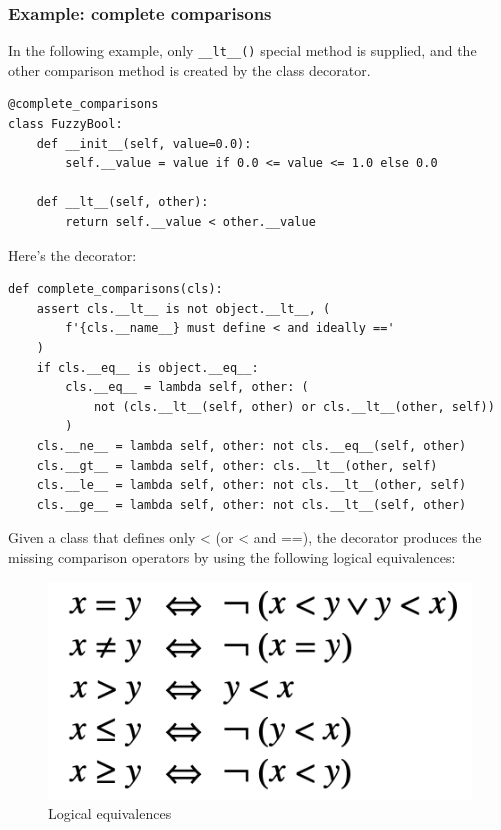 \subsubsection{Example: complete comparisons}


In the following example, only \verb|__lt__()| special method is supplied, and the other comparison method is created by the class decorator.
\begin{lstlisting}
@complete_comparisons
class FuzzyBool:
    def __init__(self, value=0.0):
        self.__value = value if 0.0 <= value <= 1.0 else 0.0

    def __lt__(self, other):
        return self.__value < other.__value
\end{lstlisting}


Here's the decorator:
\begin{lstlisting}
def complete_comparisons(cls):
    assert cls.__lt__ is not object.__lt__, (
        f'{cls.__name__} must define < and ideally =='
    )
    if cls.__eq__ is object.__eq__:
        cls.__eq__ = lambda self, other: (
            not (cls.__lt__(self, other) or cls.__lt__(other, self))
        )
    cls.__ne__ = lambda self, other: not cls.__eq__(self, other)
    cls.__gt__ = lambda self, other: cls.__lt__(other, self)
    cls.__le__ = lambda self, other: not cls.__lt__(other, self)
    cls.__ge__ = lambda self, other: not cls.__lt__(self, other)
\end{lstlisting}


Given a class that defines only < (or < and ==), the decorator produces the missing comparison operators by using the following logical equivalences:
\begin{figure}[H]
  \centering
  \includegraphics[width=\textwidth]{pics/logical-equivalences}
  \caption{Logical equivalences}
\end{figure}


